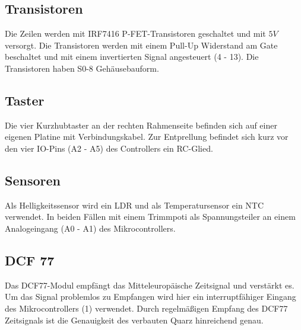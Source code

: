 \begin{multicols}{2}
\subsection{Transistoren}
Die Zeilen werden mit IRF7416 P-FET-Transistoren geschaltet und mit $5V$ versorgt. Die Transistoren werden mit einem Pull-Up Widerstand am Gate beschaltet und mit einem invertierten Signal angesteuert (4 - 13). Die Transistoren haben S0-8 Gehäusebauform. 
\subsection{Taster}
Die vier Kurzhubtaster an der rechten Rahmenseite befinden sich auf einer eigenen Platine mit Verbindungskabel. Zur Entprellung befindet sich kurz vor den vier IO-Pins (A2 - A5) des Controllers ein RC-Glied. 
\subsection{Sensoren}
Als Helligkeitssensor wird ein LDR und als Temperatursensor ein NTC verwendet. In beiden Fällen mit einem Trimmpoti als Spannungsteiler an einem Analogeingang (A0 - A1) des Mikrocontrollers.
\subsection{DCF 77}
Das DCF77-Modul empfängt das Mitteleuropäische Zeitsignal und verstärkt es. Um das Signal problemlos zu Empfangen wird hier ein interruptfähiger Eingang des Mikrocontrollers (1) verwendet. Durch regelmäßigen Empfang des DCF77 Zeitsignals ist die Genauigkeit des verbauten Quarz hinreichend genau.

\end{multicols}

